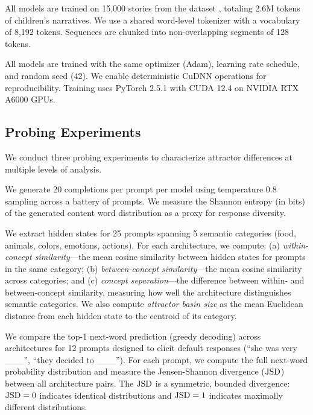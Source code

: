  All models are trained on 15,000 stories from the \tinystories dataset \citep{eldan2023tinystories}, totaling 2.6M tokens of children's narratives. We use a shared word-level tokenizer with a vocabulary of 8,192 tokens. Sequences are chunked into non-overlapping segments of 128 tokens.

 All models are trained with the same optimizer (Adam), learning rate schedule, and random seed (42). We enable deterministic CuDNN operations for reproducibility. Training uses PyTorch 2.5.1 with CUDA 12.4 on NVIDIA RTX A6000 GPUs.

\subsection{Probing Experiments}
\label{sec:method_probing}

We conduct three probing experiments to characterize attractor differences at multiple levels of analysis.

 We generate 20 completions per prompt per model using temperature 0.8 sampling across a battery of prompts. We measure the Shannon entropy (in bits) of the generated content word distribution as a proxy for response diversity.

 We extract hidden states for 25 prompts spanning 5 semantic categories (food, animals, colors, emotions, actions). For each architecture, we compute: (a) \emph{within-concept similarity}---the mean cosine similarity between hidden states for prompts in the same category; (b) \emph{between-concept similarity}---the mean cosine similarity across categories; and (c) \emph{concept separation}---the difference between within- and between-concept similarity, measuring how well the architecture distinguishes semantic categories. We also compute \emph{attractor basin size} as the mean Euclidean distance from each hidden state to the centroid of its category.

 We compare the top-1 next-word prediction (greedy decoding) across architectures for 12 prompts designed to elicit default responses (\eg ``she was very \_\_\_'', ``they decided to \_\_\_''). For each prompt, we compute the full next-word probability distribution and measure the Jensen-Shannon divergence ($\mathrm{JSD}$) between all architecture pairs. The $\mathrm{JSD}$ is a symmetric, bounded divergence: $\mathrm{JSD} = 0$ indicates identical distributions and $\mathrm{JSD} = 1$ indicates maximally different distributions.

